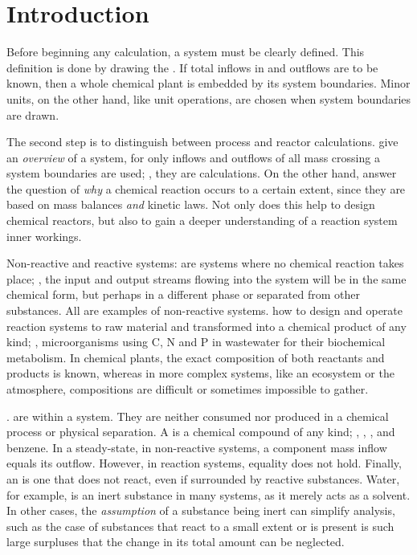 \section{Introduction}
Before beginning any calculation, a system must be clearly defined. This definition is done by drawing the . If total inflows in and outflows are to be known, then a whole chemical plant is embedded by its system boundaries. Minor units, on the other hand, like unit operations, are chosen when system boundaries are drawn.

The second step is to distinguish between process and reactor calculations.  give an \emph{overview} of a system, for only inflows and outflows of all mass crossing a system boundaries are used; \ie, they are  calculations. On the other hand,  answer the question of \emph{why} a chemical reaction occurs to a certain extent, since they are based on mass balances \emph{and} kinetic laws. Not only does this help to design chemical reactors, but also to gain a deeper understanding of a reaction system inner workings.

Non-reactive and reactive systems:  are systems where no chemical reaction takes place; \ie, the input and output streams flowing into the system will be in the same chemical form, but perhaps in a different phase or separated from other substances. All  are examples of non-reactive systems.  how to design and operate reaction systems to raw material and transformed into a chemical product of any kind; \eg, microorganisms using \ce C, \ce N and \ce P in wastewater for their biochemical metabolism. In chemical plants, the exact composition of both reactants and products is known, whereas in more complex systems, like an ecosystem or the atmosphere, compositions are difficult or sometimes impossible to gather.

.  are  within a system. They are neither consumed nor produced in a chemical process or physical separation. A  is a chemical compound of any kind; \eg, , ,  and benzene. In a steady-state, in non-reactive systems, a component mass inflow equals its outflow. However, in reaction systems, equality does not hold. Finally, an  is one that does not react, even if surrounded by reactive substances. Water, for example, is an inert substance in many systems, as it merely acts as a solvent. In other cases, the \emph{assumption} of a substance being inert can simplify analysis, such as the case of substances that react to a small extent or is present is such large surpluses that the change in its total amount can be neglected.
